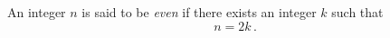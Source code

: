 \guard

\begin{defn}
\label{defn:even}
  An integer $n$ is said to be \emph{even} if there exists an integer $k$ such that \[ n = 2 k \,.\]
\end{defn}
